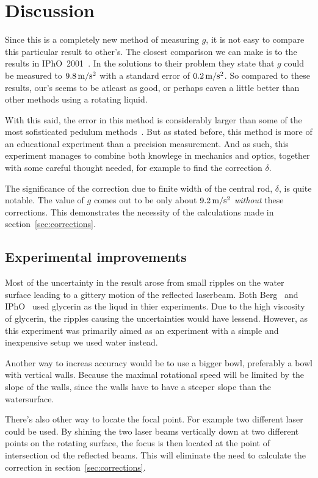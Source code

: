 \documentclass[11pt,towcolumn, swedish, english]{article}
\begin{document}
\section{Discussion}
Since this is a completely new method of measuring $g$, it is not
easy to compare this particular result to other's. The closest
comparison we can make is to the results in
IPhO~2001~\cite{IPhO2001}. In the solutions to their problem
they state that $g$ could be measured to
$\unit[9.8]{m/s^2}$ with a standard error of $\unit[0.2]{m/s^2}$. So
compared to these results, our's seems to be atleast as good, or perhaps
eaven a little better than other methods using a rotating liquid. 

With this said, the error in this method is considerably larger than
some of the most sofisticated pedulum methods~\cite{Candela2001}. But
as stated before, this method is more of an educational experiment
than a precision measurement. And as such, this experiment manages to
combine both knowlege in mechanics and optics, together with some
careful thought needed, for example to find the correction $\delta$. 

The significance of the correction due to finite width of the central
rod, $\delta$, is quite notable. The value of $g$ comes out to be only
about $\unit[9.2]{m/s^2}$ \emph{without} these corrections. This
demonstrates the necessity of the calculations made in
section~\ref{sec:corrections}. 


\subsection{Experimental improvements}
Most of the uncertainty in the result arose from small ripples on the
water surface leading to a gittery motion of the reflected
laserbeam. Both Berg~\cite{Berg1990} and IPhO~\cite{IPhO2001} used
glycerin as the liqud in thier experiments. Due to the high viscosity
of glycerin, the ripples causing the uncertainties would have lessend.
However, as this experiment was primarily aimed as an experiment with a
simple and inexpensive setup we used water instead.  

Another way to increas accuracy would be to use a bigger bowl,
preferably a bowl with vertical walls. Because the maximal rotational
speed will be limited by the slope of the walls, since the walls have
to have a steeper slope than the watersurface.

There's also other way to locate the focal point. For example two
different laser could be used. By shining the two laser beams
vertically down at two different points on the rotating surface, the
focus is then located at the point of intersection od the reflected
beams. This will eliminate the need to calculate the correction in
section~\ref{sec:corrections}. 
\end{document}
